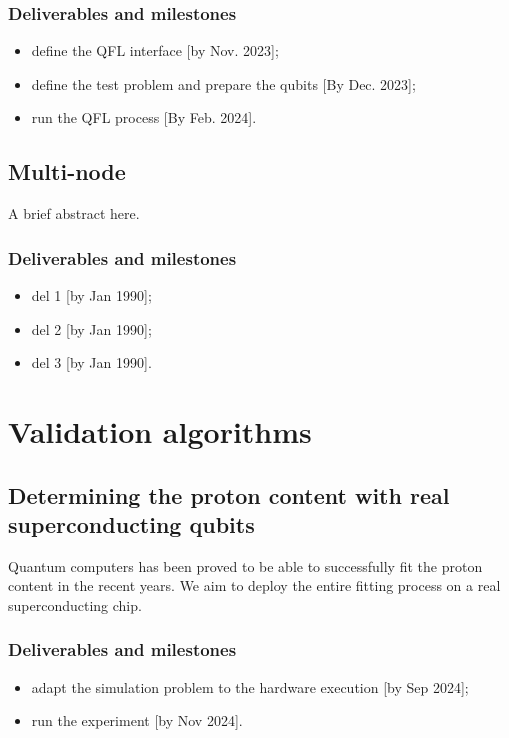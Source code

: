 \documentclass[11pt]{article}
\begin{document}
\subsubsection*{Deliverables and milestones}
\begin{itemize}[noitemsep]
\item define the QFL interface [by Nov. 2023];
\item define the test problem and prepare the qubits [By Dec. 2023];
\item run the QFL process [By Feb. 2024].
\end{itemize}

\subsection{Multi-node}
A brief abstract here.


\subsubsection*{Deliverables and milestones}
\begin{itemize}[noitemsep]
\item del 1 [by Jan 1990];
\item del 2 [by Jan 1990];
\item del 3 [by Jan 1990].
\end{itemize}

\section{Validation algorithms}

\subsection{Determining the proton content with real superconducting qubits}
Quantum computers has been proved to be able to successfully fit the proton content
in the recent years. We aim to deploy the entire fitting process on a real 
superconducting chip. 


\subsubsection*{Deliverables and milestones}
\begin{itemize}[noitemsep]
\item adapt the simulation problem to the hardware execution [by Sep 2024];
\item run the experiment [by Nov 2024].
\end{itemize}
\end{document}
